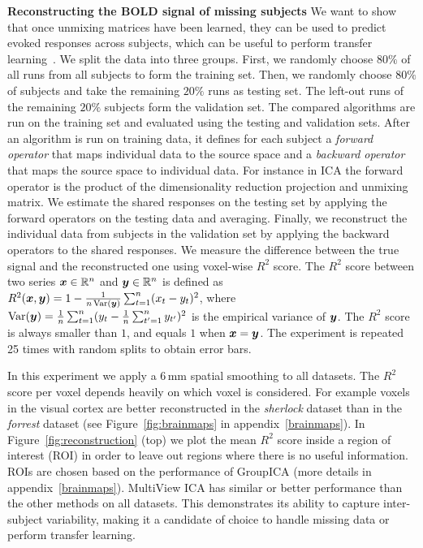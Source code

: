 \textbf{Reconstructing the BOLD signal of missing subjects}
We want to show that once unmixing matrices have been learned, they can be
used to predict
evoked responses across subjects, which can be useful to perform transfer learning~\cite{zhang2018transfer}.
%
We split the data into three groups. First, we randomly choose $80\%$ of all runs from all subjects to form the training set.
%
Then, we randomly choose $80\%$ of subjects and take the remaining $20\%$  runs as testing set.
%
The left-out runs  of the remaining $20\%$ subjects form the validation set.
%
The compared algorithms are run on the training set and evaluated using the testing and validation sets.
%
After an algorithm is run on training data, it defines for each subject a \emph{forward operator} that maps individual data to the source space and a \emph{backward operator} that maps the source space to individual data. For instance in ICA the forward operator is the product of the dimensionality reduction projection and unmixing matrix.
%
We estimate the shared responses on the testing set by applying the forward operators on the testing data and averaging. Finally, we reconstruct the individual data from subjects in the validation set by applying the backward operators to the shared responses. We measure the difference between the true signal and the reconstructed one using voxel-wise $R^2$ score. The $R^2$ score between two series $\boldsymbol{x} \in \mathbb{R}^n$ and $\boldsymbol{y} \in \mathbb{R}^n$ is defined as
$R^2(\boldsymbol{x}, \boldsymbol{y}) = 1 - \frac1{n\operatorname*{Var}(\boldsymbol{y})}\sum_{t=1}^n (x_t - y_t)^2$, where $\operatorname*{Var}(\boldsymbol{y}) = \frac1n\sum_{t=1}^n (y_t - \frac1n \sum_{t'=1}^n y_{t'})^2$ is the empirical variance of $\boldsymbol{y}$.
%
The $R^2$ score is always smaller than $1$, and equals $1$ when $\boldsymbol{x}= \boldsymbol{y}$.
The experiment is repeated 25 times with random splits to obtain error bars.


In this experiment we apply a 6\,mm spatial smoothing to all datasets. The $R^2$ score per
voxel depends heavily on which voxel is considered. For example voxels in the
visual cortex are better reconstructed in the \emph{sherlock} dataset than in
the \emph{forrest} dataset (see Figure~\ref{fig:brainmaps} in appendix~\ref{brainmaps}). In Figure~\ref{fig:reconstruction}
(top) we plot the mean $R^2$ score inside a region of interest (ROI) in order to leave out regions where there is no useful information.
%
ROIs are chosen based on the performance of GroupICA (more
details in appendix~\ref{brainmaps}).
%
MultiView ICA has similar or better performance than the other methods on all datasets.
%
This demonstrates its ability to capture inter-subject variability, making it a candidate of choice to handle missing data or perform transfer learning.

